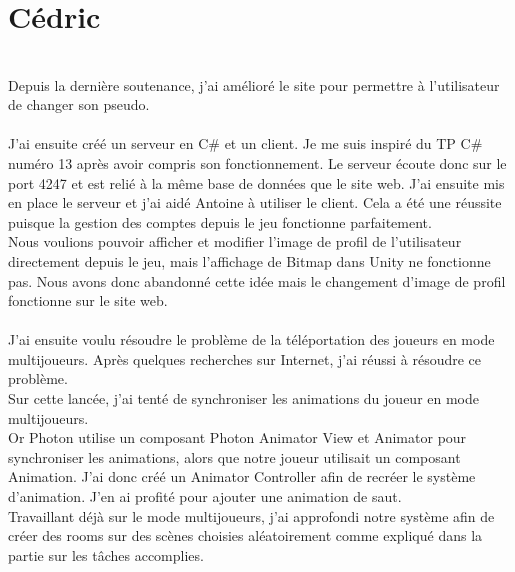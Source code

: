 \documentclass[titlepage, 13px, a4paper]{report}
\begin{document}
\newpage



\section{Cédric}
\paragraph{} \hspace{0pt} \\
Depuis la dernière soutenance, j'ai amélioré le site pour permettre à l’utilisateur de changer son pseudo. \\ \\

J’ai ensuite créé un serveur en C\# et un client. Je me suis inspiré du TP C\# numéro 13 après avoir compris son fonctionnement. Le serveur écoute donc sur le port 4247 et est relié à la même base de données que le site web. J’ai ensuite mis en place le serveur et j’ai aidé Antoine à utiliser le client.
Cela a été une réussite puisque la gestion des comptes depuis le jeu fonctionne parfaitement. \\
Nous voulions pouvoir afficher et modifier l’image de profil de l’utilisateur directement depuis le jeu, 
mais l’affichage de Bitmap dans Unity ne fonctionne pas. Nous avons donc abandonné cette idée mais le 
changement d’image de profil fonctionne sur le site web. \\ \\


J’ai ensuite voulu résoudre le problème de la téléportation des joueurs en mode multijoueurs. 
Après quelques recherches sur Internet, j’ai réussi à résoudre ce problème. \\
Sur cette lancée, j’ai tenté de synchroniser les animations du joueur en mode multijoueurs. \\
Or Photon utilise un composant Photon Animator View et Animator pour synchroniser les animations, alors que notre joueur utilisait un composant Animation. 
J’ai donc créé un Animator Controller afin de recréer le système d’animation. J’en ai profité pour ajouter une animation de saut. \\
Travaillant déjà sur le mode multijoueurs, j’ai approfondi notre système afin de créer 
des rooms sur des scènes choisies aléatoirement comme expliqué dans la partie sur les tâches accomplies. \\ \\
\end{document}
